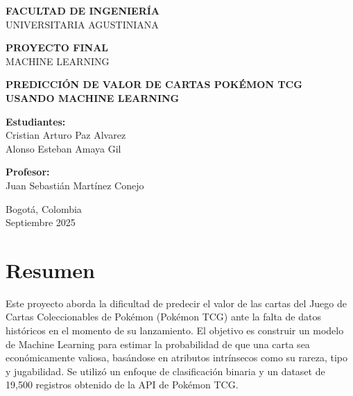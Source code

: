 \documentclass[12pt,letterpaper]{article}
\begin{document}
\begin{titlepage}
\centering
\vspace*{2cm}

{\Large \textbf{FACULTAD DE INGENIERÍA}}\\
\vspace{0.5cm}
{\large UNIVERSITARIA AGUSTINIANA}\\
\vspace{2cm}

{\Large \textbf{PROYECTO FINAL}}\\
\vspace{0.5cm}
{\large MACHINE LEARNING}\\
\vspace{2cm}

{\Large \textbf{PREDICCIÓN DE VALOR DE CARTAS POKÉMON TCG}}\\
\vspace{0.5cm}
{\large \textbf{USANDO MACHINE LEARNING}}\\
\vspace{2cm}

{\large \textbf{Estudiantes:}}\\
Cristian Arturo Paz Alvarez\\
Alonso Esteban Amaya Gil\\
\vspace{1cm}

{\large \textbf{Profesor:}}\\
Juan Sebastián Martínez Conejo\\
\vspace{2cm}

{\large Bogotá, Colombia}\\
{\large Septiembre 2025}

\end{titlepage}

\tableofcontents
\newpage

\section{Resumen}

Este proyecto aborda la dificultad de predecir el valor de las cartas del Juego de Cartas Coleccionables de Pokémon (Pokémon TCG) ante la falta de datos históricos en el momento de su lanzamiento. El objetivo es construir un modelo de Machine Learning para estimar la probabilidad de que una carta sea económicamente valiosa, basándose en atributos intrínsecos como su rareza, tipo y jugabilidad. Se utilizó un enfoque de clasificación binaria y un dataset de 19,500 registros obtenido de la API de Pokémon TCG. 
\end{document}
